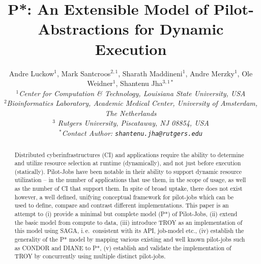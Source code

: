 \documentclass[conference,final]{IEEEtran}
\title{P*: An Extensible Model of Pilot-Abstractions for Dynamic Execution}
\date{}
\newcommand{\up}{\vspace*{-1em}}
\newcommand{\upp}{\vspace*{-0.5em}}
\begin{document}
\ifpdf
{}
\else
{}
\fi

\author{
  Andre Luckow$^{1}$, Mark Santcroos$^{2,1}$, Sharath Maddineni$^{1}$, Andre Merzky$^{1}$, Ole Weidner$^{1}$, Shantenu Jha$^{3,1*}$\\
  \small{\emph{$^{1}$Center for Computation \& Technology, Louisiana State University, USA}}\\
 \small{\emph{$^{2}$Bioinformatics Laboratory, Academic Medical Center, University of Amsterdam, The Netherlands}}\\
 \small{\emph{$^{3}$ Rutgers University, Piscataway, NJ 08854, USA}}\\
  \small{\emph{$^{*}$Contact Author: \texttt{shantenu.jha@rutgers.edu}}}\\
  \up\up\up\up }

\maketitle

\begin{abstract}
  \up Distributed cyberinfrastructures (CI) and applications require
  the ability to determine and utilize resource selection at runtime
  (dynamically), and not just before execution (statically).
  Pilot-Jobs have been notable in their ability to support dynamic
  resource utilization -- in the number of applications that use them,
  in the scope of usage, as well as the number of CI that support
  them.  In spite of broad uptake, there does not exist however, a
  well defined, unifying conceptual framework for pilot-jobs which can
  be used to define, compare and contrast different
  implementations. This paper is an attempt to (i) provide a minimal
  but complete model (P*) of Pilot-Jobs, (ii) extend the basic model
  from compute to data, (iii) introduce TROY as an implementation of
  this model using SAGA, i.\,e.\ consistent with its API, job-model
  etc., (iv) establish the generality of the P* model by mapping
  various existing and well known pilot-jobs such as CONDOR and DIANE
  to P*, (v) establish and validate the implementation of TROY by
  concurrently using multiple distinct pilot-jobs. \upp\upp\upp\upp
\end{abstract}
\end{document}
